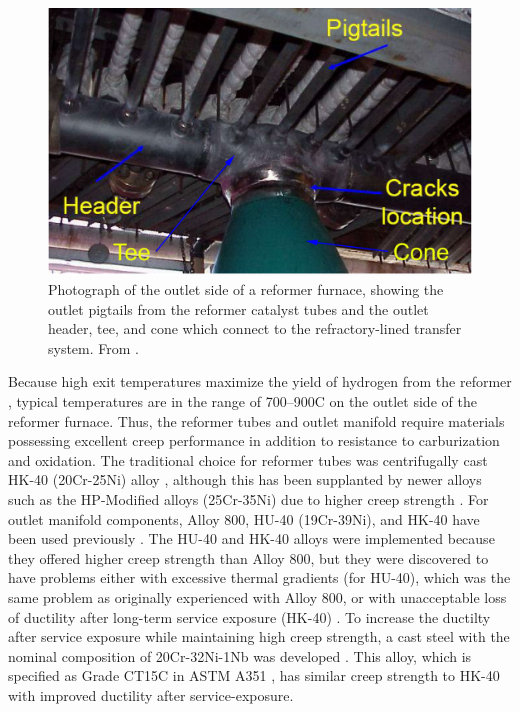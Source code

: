 \begin{figure}[h]
\centering
\includegraphics{figures/reformer-tee-cone}
\caption{Photograph of the outlet side of a reformer furnace, showing the outlet pigtails from the reformer catalyst tubes and the outlet header, tee, and cone which connect to the refractory-lined transfer system.  From \citet{penso_repair_2006}.}
\label{fig:reformer-tee-cone}
\end{figure}

Because high exit temperatures maximize the yield of hydrogen from the reformer \cite{haussinger_hydrogen_2000}, typical temperatures are in the range of 700--900C on the outlet side of the reformer furnace. Thus, the reformer tubes and outlet manifold require materials possessing excellent creep performance in addition to resistance to carburization and oxidation. The traditional choice for reformer tubes was centrifugally cast HK-40 (20Cr-25Ni) alloy \cite{rostrup-nielsen_catalytic_1984}, although this has been supplanted by newer alloys such as the HP-Modified alloys (25Cr-35Ni) due to higher creep strength \cite{schillmoller_hp-modified_1992}. For outlet manifold components, Alloy 800, HU-40 (19Cr-39Ni), and HK-40 have been used previously \cite{shibasaki_experience_1993}. The HU-40 and HK-40 alloys were implemented because they offered higher creep strength than Alloy 800, but they were discovered to have problems either with excessive thermal gradients (for HU-40), which was the same problem as originally experienced with Alloy 800, or with unacceptable loss of ductility after long-term service exposure (HK-40) \cite{shibasaki_experience_1993,collins_effect_1980}. To increase the ductilty after service exposure while maintaining high creep strength, a cast steel with the nominal composition of 20Cr-32Ni-1Nb was developed \cite{collins_effect_1980}. This alloy, which is specified as Grade CT15C in ASTM A351 \cite{astm_a351_2010}, has similar creep strength to HK-40 \cite{shibasaki_experience_1993} with improved ductility after service-exposure. 

